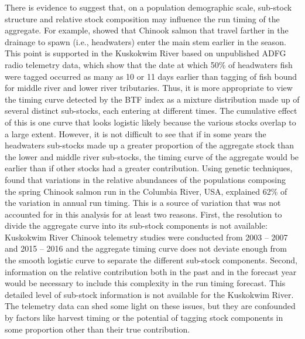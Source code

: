 \documentclass[12pt,]{book}
\theoremstyle{definition}
\theoremstyle{definition}
\theoremstyle{definition}
\theoremstyle{remark}
\begin{document}
There is evidence to suggest that, on a population demographic scale,
sub-stock structure and relative stock composition may influence the run
timing of the aggregate. For example, \citet{clark-etal-2015} showed
that Chinook salmon that travel farther in the drainage to spawn (i.e.,
headwaters) enter the main stem earlier in the season. This point is
supported in the Kuskokwim River based on unpublished ADFG radio
telemetry data, which show that the date at which 50\% of headwaters
fish were tagged occurred as many as 10 or 11 days earlier than tagging
of fish bound for middle river and lower river tributaries. Thus, it is
more appropriate to view the timing curve detected by the BTF index as a
mixture distribution made up of several distinct sub-stocks, each
entering at different times. The cumulative effect of this is one curve
that looks logistic likely because the various stocks overlap to a large
extent. However, it is not difficult to see that if in some years the
headwaters sub-stocks made up a greater proportion of the aggregate
stock than the lower and middle river sub-stocks, the timing curve of
the aggregate would be earlier than if other stocks had a greater
contribution. Using genetic techniques, \citet{anderson-beer-2009} found
that variations in the relative abundances of the populations composing
the spring Chinook salmon run in the Columbia River, USA, explained 62\%
of the variation in annual run timing. This is a source of variation
that was not accounted for in this analysis for at least two reasons.
First, the resolution to divide the aggregate curve into its sub-stock
components is not available: Kuskokwim River Chinook telemetry studies
were conducted from 2003 -- 2007 and 2015 -- 2016 and the aggregate
timing curve does not deviate enough from the smooth logistic curve to
separate the different sub-stock components. Second, information on the
relative contribution both in the past and in the forecast year would be
necessary to include this complexity in the run timing forecast. This
detailed level of sub-stock information is not available for the
Kuskokwim River. The telemetry data can shed some light on these issues,
but they are confounded by factors like harvest timing \citep[some
stocks may be harvested preferentially purely due to the timing of the
fishery, which does not mirror that of the aggregate
run;][]{hamazaki-2008} or the potential of tagging stock components in
some proportion other than their true contribution.
\end{document}
